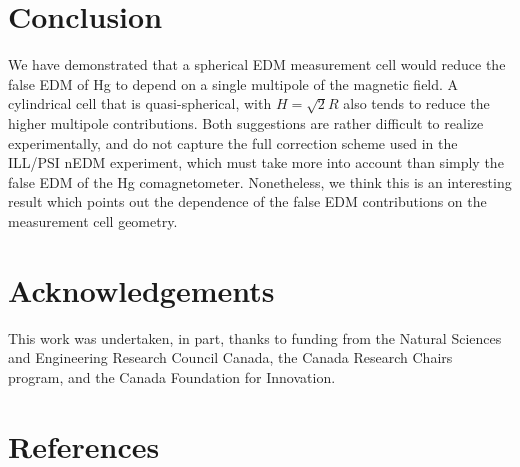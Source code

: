 \documentclass[preprint,12pt]{elsarticle}
\begin{document}
\section{Conclusion}

We have demonstrated that a spherical EDM measurement cell would
reduce the false EDM of Hg to depend on a single multipole of the
magnetic field.  A cylindrical cell that is quasi-spherical, with
$H=\sqrt{2}R$ also tends to reduce the higher multipole contributions.
Both suggestions are rather difficult to realize experimentally, and
do not capture the full correction scheme used in the ILL/PSI nEDM
experiment, which must take more into account than simply the false
EDM of the Hg comagnetometer.  Nonetheless, we think this is an
interesting result which points out the dependence of the false EDM
contributions on the measurement cell geometry.

\section*{Acknowledgements}

This work was undertaken, in part, thanks to funding from the Natural
Sciences and Engineering Research Council Canada, the Canada Research
Chairs program, and the Canada Foundation for Innovation.

\section*{References}








\end{document}
